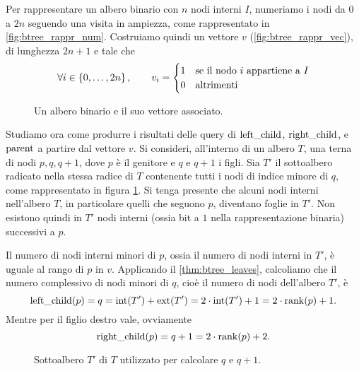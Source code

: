 Per rappresentare un albero binario con $n$ nodi interni $I$, numeriamo i nodi da $0$ a $2n$ seguendo una visita in ampiezza, come rappresentato in \cref{fig:btree_rappr_num}.
Costruiamo quindi un vettore $v$ (\cref{fig:btree_rappr_vec}), di lunghezza $2n+1$ e tale che
\begin{equation*}
	\forall i\in\left\{ 0,\dots,2n \right\},\qquad v_i = \begin{cases}
		1 & \text{se il nodo $i$ appartiene a $I$} \\
		0 & \text{altrimenti}
	\end{cases}
\end{equation*}

\begin{figure}
	\centering
	
	\caption{Un albero binario e il suo vettore associato.}
\end{figure}

Studiamo ora come produrre i risultati delle query di $\mathrm{left\_child}$, $\mathrm{right\_child}$, e $\mathrm{parent}$ a partire dal vettore $v$.
Si consideri, all'interno di un albero $T$, una terna di nodi $p,q,q+1$, dove $p$ è il genitore e $q$ e $q+1$ i figli.
Sia $T'$ il sottoalbero radicato nella stessa radice di $T$ contenente tutti i nodi di indice minore di $q$, come rappresentato in figura \ref{fig:btree_rappr_step}.
Si tenga presente che alcuni nodi interni nell'albero $T$, in particolare quelli che seguono $p$, diventano foglie in $T'$.
Non esistono quindi in $T'$ nodi interni (ossia bit a $1$ nella rappresentazione binaria) successivi a $p$.

Il numero di nodi interni minori di $p$, ossia il numero di nodi interni in $T'$, è uguale al rango di $p$ in $v$. Applicando il \cref{thm:btree_leaves}, calcoliamo che il numero complessivo di nodi minori di $q$, cioè il numero di nodi dell'albero $T'$, è
\begin{equation}\label{eq:btree:left_child}
	\mathrm{left\_child}(p) = q = \mathrm{int}(T')+\mathrm{ext}(T') = 2\cdot\mathrm{int}(T')+1 = 2\cdot\mathrm{rank}(p)+1 \text.
\end{equation}
Mentre per il figlio destro vale, ovviamente
\begin{equation}\label{eq:btree:right_child}
	\mathrm{right\_child}(p) = q+1 = 2\cdot\mathrm{rank}(p)+2 \text.
\end{equation}

\begin{figure}
	\centering
	
	\caption{Sottoalbero $T'$ di $T$ utilizzato per calcolare $q$ e $q+1$.}
	\label{fig:btree_rappr_step}
\end{figure}

